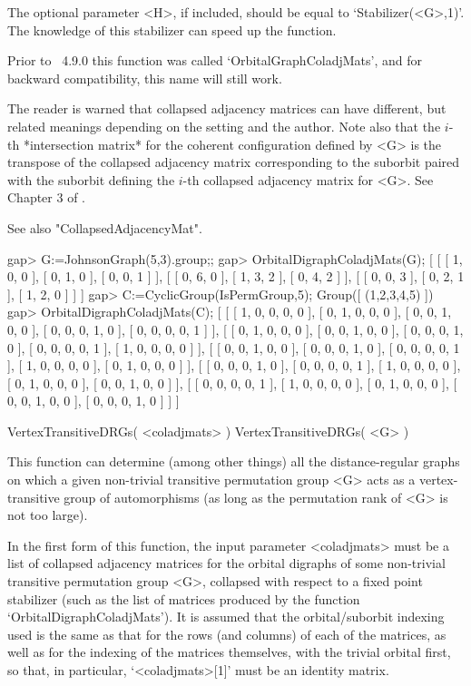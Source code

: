 The optional parameter <H>, if included, should be equal to
`Stabilizer(<G>,1)'. The knowledge of this stabilizer can speed up the
function.

Prior to {\GRAPE}~4.9.0 this function was called `OrbitalGraphColadjMats',
and for backward compatibility, this name will still work.

The reader is warned that collapsed adjacency matrices can have different,
but related meanings depending on the setting and the author. Note also
that the $i$-th *intersection matrix* for the coherent configuration
defined by <G> is the transpose of the collapsed adjacency matrix
corresponding to the suborbit paired with the suborbit defining the
$i$-th collapsed adjacency matrix for <G>. See Chapter 3 of \cite{Cam99}.

See also "CollapsedAdjacencyMat".

\beginexample
gap> G:=JohnsonGraph(5,3).group;;
gap> OrbitalDigraphColadjMats(G);
[ [ [ 1, 0, 0 ], [ 0, 1, 0 ], [ 0, 0, 1 ] ], 
  [ [ 0, 6, 0 ], [ 1, 3, 2 ], [ 0, 4, 2 ] ], 
  [ [ 0, 0, 3 ], [ 0, 2, 1 ], [ 1, 2, 0 ] ] ]
gap> C:=CyclicGroup(IsPermGroup,5);
Group([ (1,2,3,4,5) ])
gap> OrbitalDigraphColadjMats(C);
[ [ [ 1, 0, 0, 0, 0 ], [ 0, 1, 0, 0, 0 ], [ 0, 0, 1, 0, 0 ], 
      [ 0, 0, 0, 1, 0 ], [ 0, 0, 0, 0, 1 ] ], 
  [ [ 0, 1, 0, 0, 0 ], [ 0, 0, 1, 0, 0 ], [ 0, 0, 0, 1, 0 ], 
      [ 0, 0, 0, 0, 1 ], [ 1, 0, 0, 0, 0 ] ], 
  [ [ 0, 0, 1, 0, 0 ], [ 0, 0, 0, 1, 0 ], [ 0, 0, 0, 0, 1 ], 
      [ 1, 0, 0, 0, 0 ], [ 0, 1, 0, 0, 0 ] ], 
  [ [ 0, 0, 0, 1, 0 ], [ 0, 0, 0, 0, 1 ], [ 1, 0, 0, 0, 0 ], 
      [ 0, 1, 0, 0, 0 ], [ 0, 0, 1, 0, 0 ] ], 
  [ [ 0, 0, 0, 0, 1 ], [ 1, 0, 0, 0, 0 ], [ 0, 1, 0, 0, 0 ], 
      [ 0, 0, 1, 0, 0 ], [ 0, 0, 0, 1, 0 ] ] ]
\endexample


\>VertexTransitiveDRGs( <coladjmats> )
\>VertexTransitiveDRGs( <G> )

This function can determine (among other things) all the distance-regular
graphs on which a given non-trivial transitive permutation group <G>
acts as a vertex-transitive group of automorphisms (as long as the
permutation rank of <G> is not too large).

In the first form of this function, the input parameter <coladjmats> must
be a list of collapsed adjacency matrices for the orbital digraphs of some
non-trivial transitive permutation group <G>, collapsed with respect to a
fixed point stabilizer (such as the list of matrices produced by the function
`OrbitalDigraphColadjMats').  It is assumed that the orbital/suborbit
indexing used is the same as that for the rows (and columns) of each of
the matrices, as well as for the indexing of the matrices themselves,
with the trivial orbital first, so that, in particular, `<coladjmats>[1]'
must be an identity matrix.

